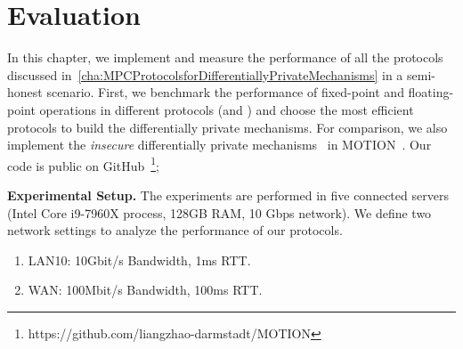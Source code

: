 \chapter{Evaluation}
\label{cha:evaluation}



In this chapter, we implement and measure the performance of all the protocols discussed in~\autoref{cha:MPCProtocolsforDifferentiallyPrivateMechanisms} in a semi-honest scenario.
First, we benchmark the performance of fixed-point and floating-point operations in different \smpc protocols (\booleanGMW and \arithmeticGMW) and choose the most efficient \smpc protocols to build the differentially private mechanisms. For comparison, we also implement the \textit{insecure} differentially private mechanisms~\cite{eigner2014differentially} in MOTION~\cite{braun2022motion}.
Our code is public on GitHub~\footnote{https://github.com/liangzhao-darmstadt/MOTION};



\textbf{Experimental Setup.}
The experiments are performed in five connected servers (Intel Core i9-7960X process, 128GB RAM, 10 Gbps network). We define two network settings to analyze the performance of our \smpc protocols.
\begin{enumerate}
    \item LAN10: 10Gbit/s Bandwidth, 1ms RTT.
    \item WAN: 100Mbit/s Bandwidth, 100ms RTT.
\end{enumerate}

